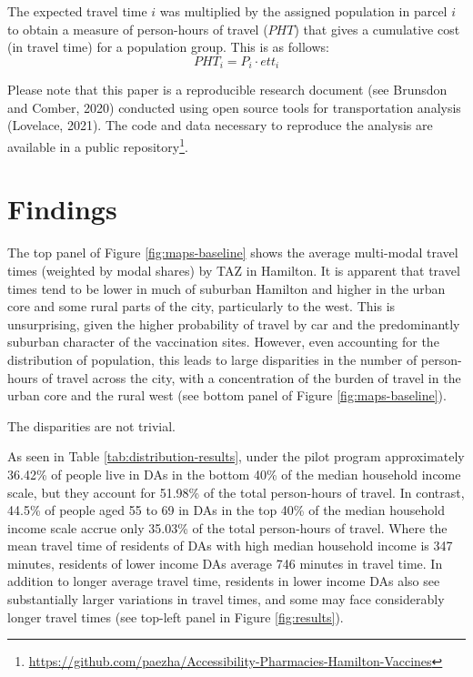 \documentclass[]{elsarticle} %
\begin{document}
The expected travel time \(i\) was multiplied by the assigned population
in parcel \(i\) to obtain a measure of person-hours of travel (\(PHT\))
that gives a cumulative cost (in travel time) for a population group.
This is as follows: \[
PHT_i = P_i\cdot ett_i
\]

Please note that this paper is a reproducible research document (see
Brunsdon and Comber, 2020) conducted using open source tools for
transportation analysis (Lovelace, 2021). The code and data necessary to
reproduce the analysis are available in a public
repository\footnote{\url{https://github.com/paezha/Accessibility-Pharmacies-Hamilton-Vaccines}}.

\hypertarget{findings}{%
\section{Findings}\label{findings}}

The top panel of Figure \ref{fig:maps-baseline} shows the average
multi-modal travel times (weighted by modal shares) by TAZ in Hamilton.
It is apparent that travel times tend to be lower in much of suburban
Hamilton and higher in the urban core and some rural parts of the city,
particularly to the west. This is unsurprising, given the higher
probability of travel by car and the predominantly suburban character of
the vaccination sites. However, even accounting for the distribution of
population, this leads to large disparities in the number of
person-hours of travel across the city, with a concentration of the
burden of travel in the urban core and the rural west (see bottom panel
of Figure \ref{fig:maps-baseline}).

The disparities are not trivial.

As seen in Table \ref{tab:distribution-results}, under the pilot program
approximately 36.42\% of people live in DAs in the bottom 40\% of the
median household income scale, but they account for 51.98\% of the total
person-hours of travel. In contrast, 44.5\% of people aged 55 to 69 in
DAs in the top 40\% of the median household income scale accrue only
35.03\% of the total person-hours of travel. Where the mean travel time
of residents of DAs with high median household income is 347 minutes,
residents of lower income DAs average 746 minutes in travel time. In
addition to longer average travel time, residents in lower income DAs
also see substantially larger variations in travel times, and some may
face considerably longer travel times (see top-left panel in Figure
\ref{fig:results}).
\end{document}

